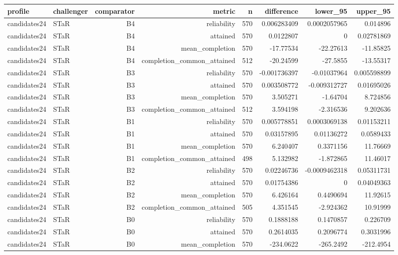 \begin{longtable}{llrrrrrr}
\hline
profile & challenger & comparator & metric & n & difference & lower\_95 & upper\_95 \\
\hline
candidates24 & STaR & B4 & reliability & 570 & 0.006283409 & 0.0002057965 & 0.014896 \\
candidates24 & STaR & B4 & attained & 570 & 0.0122807 & 0 & 0.02781869 \\
candidates24 & STaR & B4 & mean\_completion & 570 & -17.77534 & -22.27613 & -11.85825 \\
candidates24 & STaR & B4 & completion\_common\_attained & 512 & -20.24599 & -27.5855 & -13.55317 \\
candidates24 & STaR & B3 & reliability & 570 & -0.001736397 & -0.01037964 & 0.005598899 \\
candidates24 & STaR & B3 & attained & 570 & 0.003508772 & -0.009312727 & 0.01695026 \\
candidates24 & STaR & B3 & mean\_completion & 570 & 3.505271 & -1.64704 & 8.724856 \\
candidates24 & STaR & B3 & completion\_common\_attained & 512 & 3.594198 & -2.316536 & 9.202636 \\
candidates24 & STaR & B1 & reliability & 570 & 0.005778851 & 0.0003069138 & 0.01153211 \\
candidates24 & STaR & B1 & attained & 570 & 0.03157895 & 0.01136272 & 0.0589433 \\
candidates24 & STaR & B1 & mean\_completion & 570 & 6.240407 & 0.3371156 & 11.76669 \\
candidates24 & STaR & B1 & completion\_common\_attained & 498 & 5.132982 & -1.872865 & 11.46017 \\
candidates24 & STaR & B2 & reliability & 570 & 0.02246736 & -0.0009462318 & 0.05311731 \\
candidates24 & STaR & B2 & attained & 570 & 0.01754386 & 0 & 0.04049363 \\
candidates24 & STaR & B2 & mean\_completion & 570 & 6.426164 & 0.4490694 & 11.92615 \\
candidates24 & STaR & B2 & completion\_common\_attained & 505 & 4.351545 & -2.924362 & 10.91999 \\
candidates24 & STaR & B0 & reliability & 570 & 0.1888188 & 0.1470857 & 0.226709 \\
candidates24 & STaR & B0 & attained & 570 & 0.2614035 & 0.2096774 & 0.3031996 \\
candidates24 & STaR & B0 & mean\_completion & 570 & -234.0622 & -265.2492 & -212.4954 \\

\end{longtable}
